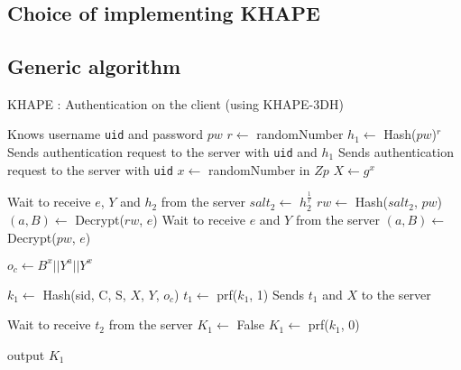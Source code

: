 \documentclass[../report.tex]{subfiles}
\begin{document}
\chapter{}

\section{Choice of implementing KHAPE}

\section{Generic algorithm}


\begin{algorithm}
\caption{KHAPE : Authentication on the client (using KHAPE-3DH)}
\label{euclid}
\begin{algorithmic}
\Require Knows username \verb|uid| and password $pw$
    \State $r \gets$ randomNumber
    \State $h_1 \gets$ Hash($pw$)$^r$
    \State Sends authentication request to the server with \verb|uid| and $h_1$
\Else
    \State Sends authentication request to the server with \verb|uid|
\EndIf
\State $x \gets$ randomNumber in $Zp$
\State $X \gets g^x$

    \State Wait to receive $e$, $Y$ and $h_2$ from the server
    \State $salt_2 \gets$ $h_2^{\frac{1}{r}}$
    \State $rw \gets$ Hash($salt_2$, $pw$)
    \State $(a, B) \gets$ Decrypt($rw$, $e$)
\Else
    \State Wait to receive $e$ and $Y$ from the server
    \State $(a, B) \gets$ Decrypt($pw$, $e$)
\EndIf

    \State $o_c \gets B^x || Y^a || Y^x$

\State $k_1 \gets$ Hash(sid, C, S, $X$, $Y$, $o_c$)
\State $t_1 \gets$ prf($k_1$, 1)
\State Sends $t_1$ and $X$ to the server


\State Wait to receive $t_2$ from the server
    \State $K_1 \gets$ False
\Else
    \State $K_1 \gets$ prf($k_1$, 0)
\EndIf

\State output $K_1$
\end{algorithmic}
\end{algorithm}
\end{document}
